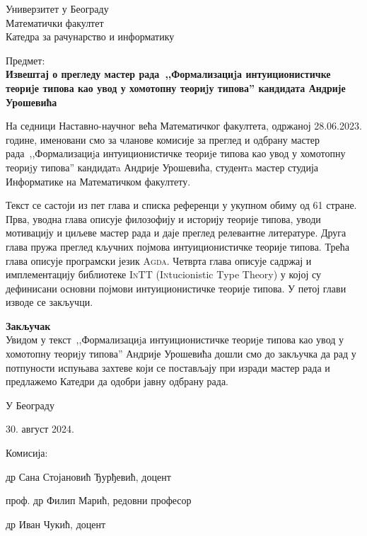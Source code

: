 \documentclass{letter}
\begin{document}
Универзитет у Београду\\
Математички факултет\\
Катедра за рачунарство и информатику

\vspace{2cm}

Предмет:\\
\textbf{Извештај о прегледу мастер рада~,,Формализациjа интуиционистичке теориjе типова као увод у хомотопну теориjу типова'' кандидата Андрије Урошевића}

\vspace{0.6cm}

На седници Наставно-научног већа Математичког факултета, одржаној 28.06.2023. године, именовани смо за чланове комисије за преглед и одбрану мастер рада~,,Формализациjа интуиционистичке теориjе типова као увод у хомотопну теориjу типова'' кандидатa Андрије Урошевића, студентa мастер студија Информатике на Математичком факултету.

Текст се састоји из пет глава и списка референци у укупном обиму од 61 стране. Прва, уводна глава описује филозофију и историју теорије типова, уводи мотивацију и циљеве мастер рада и даје преглед релевантне литературе. Друга глава пружа преглед кључних појмова интуиционистичке теорије типова. Трећа глава описује програмски језик \textsc{Agda}. Четврта глава описује садржај и имплементацију библиотеке \textsc{InTT} (\textsc{In}tucionistic \textsc{T}ype \textsc{T}heory) у којој су дефинисани основни појмови интуиционистичке теорије типова. У петој глави изводе се закључци.

\vspace{0.4cm}

\textbf{Закључак}\\
Увидом у текст~,,Формализациjа интуиционистичке теориjе типова као увод у хомотопну теориjу типова'' Андрије Урошевића дошли смо до закључка да рад у потпуности испуњава захтеве који се постављају при изради мастер рада и предлажемо Катедри да одобри јавну одбрану рада.

\vspace{1.2cm}

У Београду

30. август 2024.

\vspace{0.5cm}

Комисија:

др Сана Стојановић Ђурђевић, доцент

проф. др Филип Марић, редовни професор

др Иван Чукић, доцент
\end{document}
